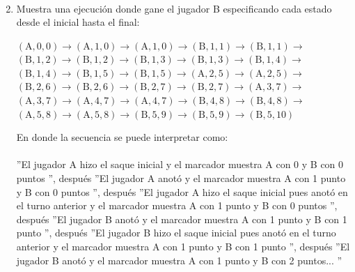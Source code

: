 \begin{exercise}
\begin{enumerate}
\[{\begin{array}{lcl}
                    \end{array}
                }
                \]
            \item Muestra una ejecución donde gane el jugador B especificando cada estado desde el inicial hasta el final: 
                \begin{center}
                    $ (\text{A},0,0) \rightarrow (\text{A},1,0) \rightarrow (\text{A},1,0) \rightarrow (\text{B},1,1) \rightarrow (\text{B},1,1) \rightarrow$ \\
                    $ (\text{B},1,2) \rightarrow (\text{B},1,2) \rightarrow (\text{B},1,3) \rightarrow (\text{B},1,3) \rightarrow (\text{B},1,4) \rightarrow$ \\
                    $ (\text{B},1,4) \rightarrow (\text{B},1,5) \rightarrow (\text{B},1,5) \rightarrow (\text{A},2,5) \rightarrow (\text{A},2,5) \rightarrow$ \\
                    $ (\text{B},2,6) \rightarrow (\text{B},2,6) \rightarrow (\text{B},2,7) \rightarrow (\text{B},2,7) \rightarrow (\text{A},3,7) \rightarrow$ \\
                    $ (\text{A},3,7) \rightarrow (\text{A},4,7) \rightarrow (\text{A},4,7) \rightarrow (\text{B},4,8) \rightarrow (\text{B},4,8) \rightarrow $\\
                    $ (\text{A},5,8) \rightarrow (\text{A},5,8) \rightarrow (\text{B},5,9) \rightarrow (\text{B},5,9) \rightarrow (\text{B},5,10) $
                \end{center}
                En donde la secuencia se puede interpretar como: \\\\
                 ''El jugador A hizo el saque inicial y el marcador muestra A con 0 y B con 0 puntos '', después  ''El jugador A anotó y el marcador muestra A con 1 punto y B con 0 puntos '', después  ''El jugador A hizo el saque inicial pues anotó en el turno anterior y el marcador muestra A con 1 punto y B con 0 puntos '', después  ''El jugador B anotó y el marcador muestra A con 1  punto y B con 1 punto '', después  ''El jugador B hizo el saque inicial pues anotó en el turno anterior y el marcador muestra A con 1  punto y B con 1 punto '', después  ''El jugador B anotó y el marcador muestra A con 1  punto y B con 2 puntos... ''         
        \end{enumerate}

    \end{exercise}

